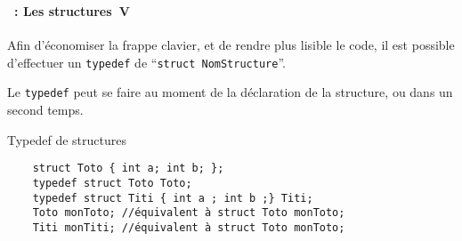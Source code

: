 \begin{frame}[containsverbatim]
  \frametitle{\secname}
  \framesubtitle{\subsecname~: Les structures~V} 

  Afin d'économiser la frappe clavier, et de rendre plus lisible le code, il est possible d'effectuer un 
  \verb|typedef| de ``\verb|struct NomStructure|''. 
  \vspace{0.3cm}
  \par
  Le \verb|typedef| peut se faire au moment de la déclaration de la structure, ou dans un second temps.
  \vspace{0.3cm}
  {\small\begin{exampleblock}{Typedef de structures}
    \begin{verbatim}
    struct Toto { int a; int b; };
    typedef struct Toto Toto;
    typedef struct Titi { int a ; int b ;} Titi;
    Toto monToto; //équivalent à struct Toto monToto;
    Titi monTiti; //équivalent à struct Toto monToto;\end{verbatim}
  \end{exampleblock}}
\end{frame}

